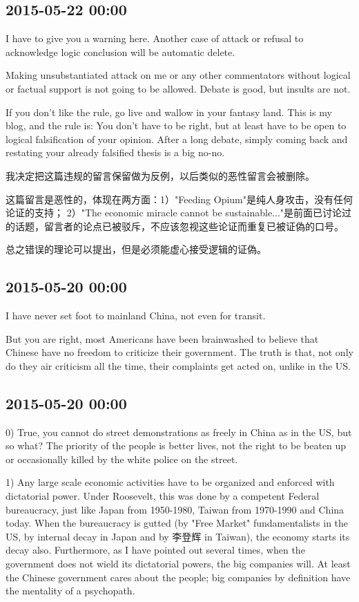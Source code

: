 \documentclass[twocolumn]{ctexart}
\begin{document}
\subsection*{2015-05-22 00:00}
I have to give you a warning here. Another case of attack or refusal to acknowledge logic conclusion will be automatic delete. 

Making unsubstantiated attack on me or any other commentators without logical or factual support is not going to be allowed. Debate is good, but insults are not.

If you don't like the rule, go live and wallow in your fantasy land. This is my blog, and the rule is: You don't have to be right, but at least have to be open to logical falsification of your opinion. After a long debate, simply coming back and restating your already falsified thesis is a big no-no.

我决定把这篇违规的留言保留做为反例，以后类似的恶性留言会被删除。

这篇留言是恶性的，体现在两方面：1）"Feeding Opium"是纯人身攻击，没有任何论证的支持； 2）"The economic miracle cannot be sustainable..."是前面已讨论过的话题，留言者的论点已被驳斥，不应该忽视这些论证而重复已被证偽的口号。

总之错误的理论可以提出，但是必须能虚心接受逻辑的证偽。\subsection*{2015-05-20 00:00}
I have never set foot to mainland China, not even for transit.

But you are right, most Americans have been brainwashed to believe that Chinese have no freedom to criticize their government. The truth is that, not only do they air criticism all the time, their complaints get acted on, unlike in the US.\subsection*{2015-05-20 00:00}
0) True, you cannot do street demonstrations as freely in China as in the US, but so what? The priority of the people is better lives, not the right to be beaten up or occasionally killed by the white police on the street.

1) Any large scale economic activities have to be organized and enforced with dictatorial power. Under Roosevelt, this was done by a competent Federal bureaucracy, just like Japan from 1950-1980, Taiwan from 1970-1990 and China today. When the bureaucracy is gutted (by "Free Market" fundamentalists in the US, by internal decay in Japan and by 李登辉 in Taiwan), the economy starts its decay also. Furthermore, as I have pointed out several times, when the government does not wield its dictatorial powers, the big companies will. At least the Chinese government cares about the people; big companies by definition have the mentality of a psychopath.
\end{document}
